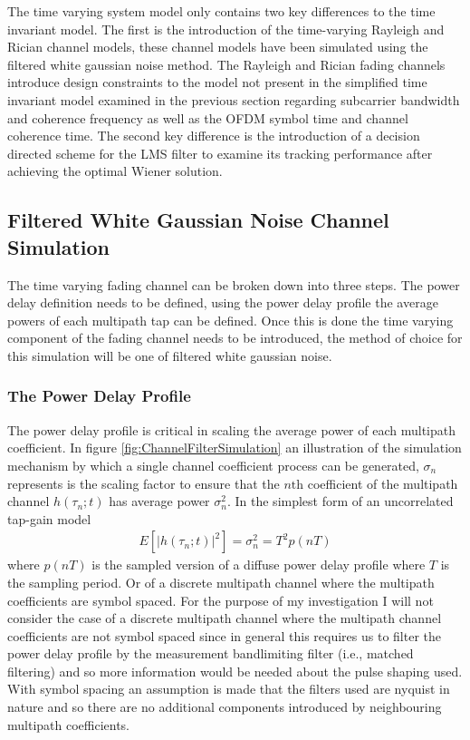 The time varying system model only contains two key differences to the %
time invariant model. The first is the introduction of the time-varying Rayleigh %
and Rician channel models, these channel models have been simulated using %
the filtered white gaussian noise method. The Rayleigh and Rician fading %
channels introduce design constraints to the model not present in the %
simplified time invariant model examined in the previous section %
regarding subcarrier bandwidth and coherence frequency %
as well as the OFDM symbol time and channel coherence time. The second %
key difference is the introduction of a decision directed scheme for the LMS %
filter to examine its tracking performance after achieving the optimal Wiener solution.

\subsection{Filtered White Gaussian Noise Channel Simulation}

The time varying fading channel can be broken down into three %
steps. The power delay definition needs to be defined, using the %
power delay profile the average powers of each multipath tap can %
be defined. Once this is done the time varying component of the %
fading channel needs to be introduced, the method of choice %
for this simulation will be one of filtered white gaussian noise. %
\subsubsection{The Power Delay Profile}

The power delay profile is critical in scaling the average power %
of each multipath coefficient. In figure \ref{fig:ChannelFilterSimulation} %
an illustration of the simulation mechanism by which a single channel %
coefficient process can be generated, $\sigma_{n}$ represents %
is the scaling factor to ensure that the $n\text{th}$ coefficient %
of the multipath channel $h(\tau_{n};t)$ has average power %
$\sigma_{n}^{2}$. In the simplest form of an uncorrelated %
tap-gain model \cite{Jer00} 
\begin{align}
	E\left[\lvert h(\tau_{n};t) \rvert^{2} \right] = %
	\sigma_{n}^{2} = T^{2}p(nT)
	\label{eq:TapPower}
\end{align}
where $p(nT)$ is the sampled version of a diffuse power %
delay profile where $T$ is the sampling period. Or of a %
discrete multipath channel where the multipath coefficients %
are symbol spaced. For the purpose of my investigation I %
will not consider the case of a discrete multipath channel %
where the multipath channel coefficients are not symbol %
spaced since in general this requires us to filter the power %
delay profile by the measurement bandlimiting filter (i.e., matched filtering) %
and so more information would be needed about the pulse shaping %
used. With symbol spacing an assumption is made that the filters used %
are nyquist in nature and so there are no additional components %
introduced by neighbouring multipath coefficients.

